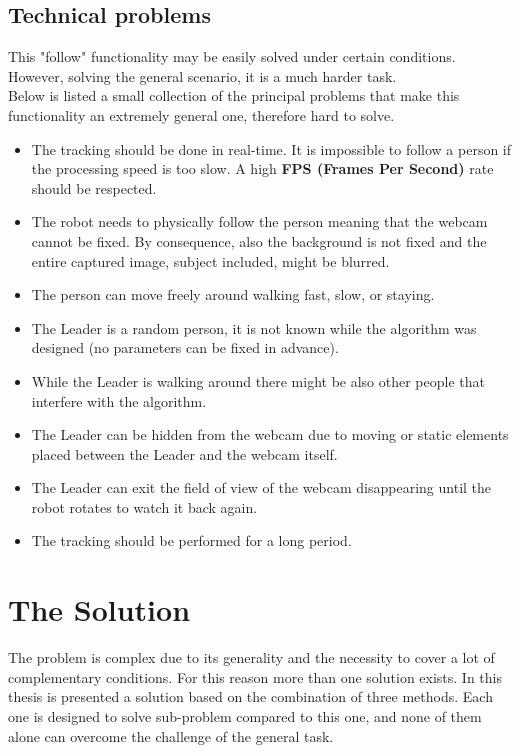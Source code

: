 \subsection{Technical problems}\label{sec:technicalProblems}
This "follow" functionality may be easily solved under certain conditions. However, solving the general scenario, it is a much harder task.\\
Below is listed a small collection of the principal problems that make this functionality an extremely general one, therefore hard to solve.
\begin{itemize}
	\item The tracking should be done in real-time. It is impossible to follow a person if the processing speed is too slow. A high \textbf{FPS (Frames Per Second)} rate should be respected.
	\item The robot needs to physically follow the person meaning that the webcam cannot be fixed. By consequence, also the background is not fixed and the entire captured image, subject included, might be blurred.
	\item The person can move freely around walking fast, slow, or staying.
	\item The Leader is a random person, it is not known while the algorithm was designed (no parameters can be fixed in advance).
	\item While the Leader is walking around there might be also other people that interfere with the algorithm.
	\item The Leader can be hidden from the webcam due to moving or static elements placed between the Leader and the webcam itself.
	\item The Leader can exit the field of view of the webcam disappearing until the robot rotates to watch it back again.
	\item The tracking should be performed for a long period.
\end{itemize}


\section{The Solution}
The problem is complex due to its generality and the necessity to cover a lot of complementary conditions. For this reason more than one solution exists. In this thesis is presented a solution based on the combination of three methods. Each one is designed to solve sub-problem compared to this one, and none of them alone can overcome the challenge of the general task.\\

